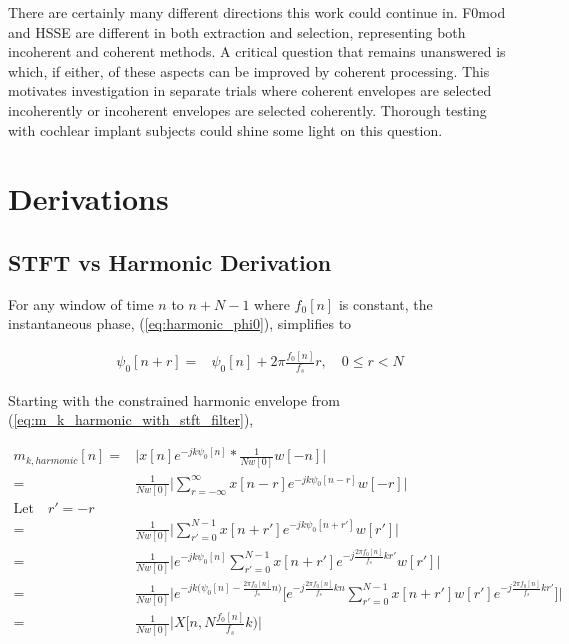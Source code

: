 \documentclass [11pt, proquest,oneside] {ganter_thesis}[2015/03/03]
\begin{document}
There are certainly many different directions this work could continue in.  F0mod and HSSE are different in both extraction and selection, representing both incoherent and coherent methods.  A critical question that remains unanswered is which, if either, of these aspects can be improved by coherent processing.  This motivates investigation in separate trials where coherent envelopes are selected incoherently or incoherent envelopes are selected coherently.  Thorough testing with cochlear implant subjects could shine some light on this question.


%
%
\nocite{*}   %


%
%
\appendix
\raggedbottom\sloppy
 

\chapter{Derivations}

\section{STFT vs Harmonic Derivation}\label{section:stft_vs_harmonic_derivation}

For any window of time $n$ to $n + N - 1$ where $f_0[n]$ is constant, the instantaneous phase, (\ref{eq:harmonic_phi0}), simplifies to

\begin{align}
\psi_0[n + r] =& \psi_0[n] + 2\pi \frac{f_0[n]}{f_s}r, \quad 0 \leq r < N
\end{align}

Starting with the constrained harmonic envelope from (\ref{eq:m_k_harmonic_with_stft_filter}), 

\begin{align}
m_{k,harmonic}[n] =& \Bigg| x[n] e^{-jk\psi_0 [n]} *  \frac{1}{Nw[0]} w[-n] \Bigg| \nonumber \\
=& \frac{1}{Nw[0]} \Bigg| \sum_{r = -\infty}^\infty x[n - r] e^{-jk\psi_0 [n-r]} w[-r] \Bigg| \nonumber \\
\textrm{Let} \quad r' = -r \nonumber \\
=& \frac{1}{Nw[0]} \Bigg| \sum_{r' = 0}^{N-1} x[n + r'] e^{-jk\psi_0 [n + r']} w[r'] \Bigg|  \nonumber \\
=& \frac{1}{Nw[0]} \Bigg| e^{-jk \psi_0[n]} \sum_{r' = 0}^{N-1} x[n + r'] e^{-j \frac{2\pi f_0[n]}{f_s}kr'} w[r'] \Bigg| \nonumber \\
=& \frac{1}{Nw[0]} \Bigg| e^{-jk \Big(\psi_0[n] - \frac{2\pi f_0[n]}{f_s}n \Big)} \Bigg[ e^{-j \frac{2\pi f_0[n]}{f_s}kn} \sum_{r' = 0}^{N-1} x[n + r'] w[r'] e^{-j \frac{2\pi f_0[n]}{f_s}kr'} \Bigg] \Bigg| \nonumber \\
=& \frac{1}{Nw[0]} \Bigg| X\Big[n, N \frac{f_0[n]}{f_s} k \Big) \Bigg| \nonumber
\end{align}
\end{document}
